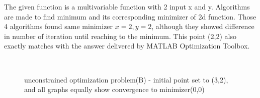 \documentclass[twoside,11pt]{article}
\begin{document}
The given function is a multivariable function with 2 input x and y. Algorithms are made to find minimum and its corresponding minimizer of 2d function.
Those 4 algorithms found same minimizer $x=2, y=2$, although they showed difference in number of iteration until reaching to the minimum. This point (2,2) also exactly matches with the answer delivered by MATLAB Optimization Toolbox.

\begin{figure}[ht!]%
\centering
{} 
 \\
\hfill
\caption{unconstrained optimization problem(B) - initial point set to (3,2), and all graphs equally show convergence to minimizer(0,0) }
\label{unconstrained problem 2}
\end{figure}
\end{document}
